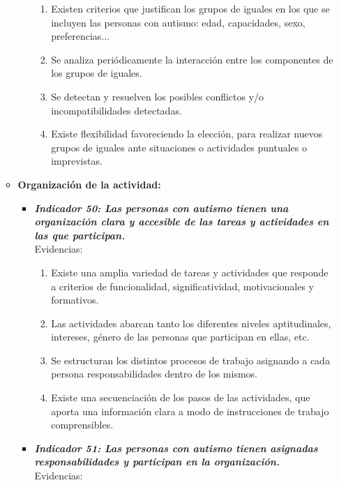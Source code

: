 \begin{itemize}
\begin{itemize}
\begin{itemize}
			\begin{enumerate}
				\item Existen criterios que justifican los grupos de iguales en los que se incluyen las personas con autismo: edad, capacidades, sexo, preferencias... 
				\item Se analiza periódicamente la interacción entre los componentes de los grupos de iguales. 
				\item Se detectan y resuelven los posibles conflictos y/o incompatibilidades detectadas. 
				\item Existe flexibilidad favoreciendo la elección, para realizar nuevos grupos de iguales ante situaciones o actividades puntuales o imprevistas. 
				
			\end{enumerate}
		\end{itemize}
		\item \textbf{Organización de la actividad:}
		\begin{itemize}
			\item \textbf{\textit{Indicador 50: Las personas con autismo tienen una organización clara y accesible de las tareas y actividades en las que participan.}}\\Evidencias:
			
			\begin{enumerate}
				\item Existe una amplia variedad de tareas y actividades que responde a criterios de funcionalidad, significatividad, motivacionales y formativos. 
				\item Las actividades abarcan tanto los diferentes niveles aptitudinales, intereses, género de las personas que participan en ellas, etc. 
				\item Se estructuran los distintos procesos de trabajo asignando a cada persona responsabilidades dentro de los mismos. 
				\item Existe una secuenciación de los pasos de las actividades, que aporta una información clara a modo de instrucciones de trabajo comprensibles. 
				 
			\end{enumerate}

			\item \textbf{\textit{Indicador 51: Las personas con autismo tienen asignadas responsabilidades y participan en la organización.}}\\Evidencias:
			

\end{itemize}
\end{itemize}
\end{itemize}
